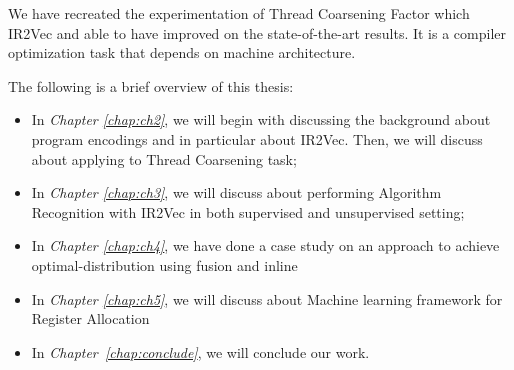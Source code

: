     	We have recreated the experimentation of Thread Coarsening Factor which IR2Vec\cite{IR2Vec} and able to have improved on the state-of-the-art results. It is a compiler optimization task that depends on machine architecture. 
    	
The following is a brief overview of this thesis:

\begin{itemize}
    \item In \textit{Chapter \ref{chap:ch2}}, we will begin with discussing the background about program encodings and in particular about IR2Vec. Then, we will discuss about applying to Thread Coarsening task; 
    
    \item In \textit{Chapter \ref{chap:ch3}}, we will discuss about performing Algorithm Recognition with IR2Vec in both supervised and unsupervised setting; 
    
    \item In \textit{Chapter \ref{chap:ch4}}, we have done a case study on an approach to achieve optimal-distribution using fusion and inline
    
    \item In \textit{Chapter \ref{chap:ch5}}, we will discuss about Machine learning framework for Register Allocation
    
    \item  In \textit{Chapter~\ref{chap:conclude}}, we will conclude our work.

\end{itemize}